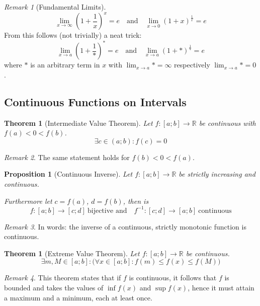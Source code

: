 \documentclass[english,titlepage]{uzhpub}
\theoremstyle{definition}
\theoremstyle{plain}
\newtheorem{proposition}[definition]{Proposition}
\newtheorem{theorem}[definition]{Theorem} %
\theoremstyle{remark}
\newtheorem*{remark}{Remark}
\theoremstyle{example}
\begin{document}
   \begin{remark}[Fundamental Limits]
      \[\lim_{x \to \infty} (1 + \frac{1}{x})^x = e \quad\text{and}\quad \lim_{x \to 0} (1 + x)^{\frac{1}{x}} = e\]
      From this follows (not trivially) a neat trick:
      \[\lim_{x \to a} (1 + \frac{1}{\ast})^* = e \quad\text{and}\quad \lim_{x \to a} (1 + \ast)^{\frac{1}{\ast}} = e\]
      where \(\ast\) is an arbitrary term in \(x\) with \(\lim_{x \to a} \ast = \infty\) respectively \(\lim_{x \to a} \ast = 0\).
   \end{remark}

   \subsection{Continuous Functions on Intervals}
   \begin{theorem}[Intermediate Value Theorem]\label{thm:intmd_value}
      Let \(f: [a; b] \to \mathbb{R}\) be continuous with \(f(a) < 0 < f(b)\).
      \[\exists c \in (a;b): f(c) = 0\]
   \end{theorem}
   \begin{remark}
      The same statement holds for \(f(b) < 0 < f(a)\).
   \end{remark}

   \begin{proposition}[Continuous Inverse]\label{pro:inv_cont}
      Let \(f: [a; b] \to \mathbb{R}\) be strictly increasing and continuous.

      Furthermore let \(c = f(a)\), \(d = f(b)\), then is
      \[f: [a;b] \to [c;d]~\text{bijective and} \quad f^{-1}: [c;d] \to [a;b]~\text{continuous}\]
   \end{proposition}
   \begin{remark}
      In words: the inverse of a continuous, strictly monotonic function is continuous.
   \end{remark}

   \begin{theorem}[Extreme Value Theorem]\label{thm:extreme_value}
      Let \(f: [a; b] \to \mathbb{R}\) be continuous.
      \[\exists m, M \in [a; b]: \big(\forall x \in [a; b]: f(m) \leq f(x) \leq f(M)\big)\]
   \end{theorem}
   \begin{remark}
      This theorem states that if \(f\) is continuous, it follows that \(f\) is bounded and takes the values of \(\inf f(x)\) and \(\sup f(x)\), hence it must attain a maximum and a minimum, each at least once.
   \end{remark}
\end{document}
